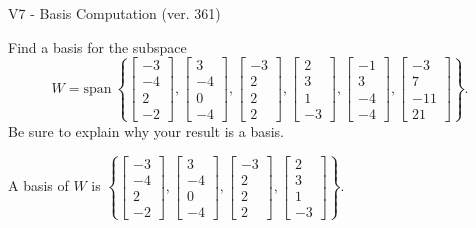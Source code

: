 \begin{exercise}
  \begin{exerciseTitle}V7 - Basis Computation (ver. 361)\end{exerciseTitle}
  \begin{exerciseStatement}
    Find a basis for the subspace 
\[W=\mathrm{span}\ \left\{\left[\begin{array}{r}
-3 \\
-4 \\
2 \\
-2
\end{array}\right] , \left[\begin{array}{r}
3 \\
-4 \\
0 \\
-4
\end{array}\right] , \left[\begin{array}{r}
-3 \\
2 \\
2 \\
2
\end{array}\right] , \left[\begin{array}{r}
2 \\
3 \\
1 \\
-3
\end{array}\right] , \left[\begin{array}{r}
-1 \\
3 \\
-4 \\
-4
\end{array}\right] , \left[\begin{array}{r}
-3 \\
7 \\
-11 \\
21
\end{array}\right]\right\}.\]
 Be sure to explain why your result is a basis.


  \end{exerciseStatement}
  \begin{exerciseAnswer}
   A basis of \(W\) is  \(\left\{\left[\begin{array}{r}
-3 \\
-4 \\
2 \\
-2
\end{array}\right] , \left[\begin{array}{r}
3 \\
-4 \\
0 \\
-4
\end{array}\right] , \left[\begin{array}{r}
-3 \\
2 \\
2 \\
2
\end{array}\right] , \left[\begin{array}{r}
2 \\
3 \\
1 \\
-3
\end{array}\right]\right\}\).
  


  \end{exerciseAnswer}
\end{exercise}